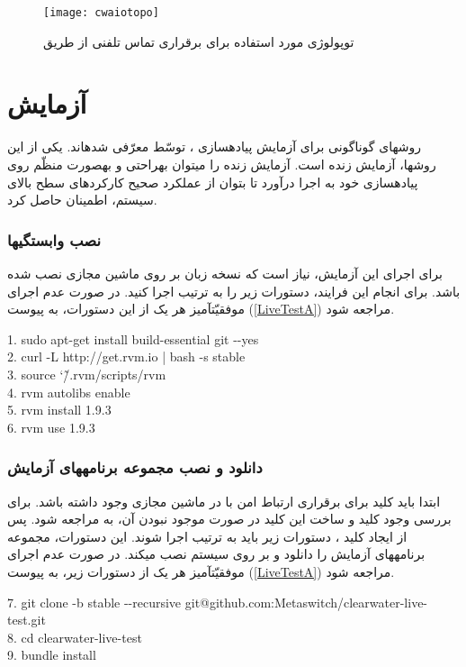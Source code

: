 \begin{figure}[H]
\centering
\texttt{[image: cwaiotopo]}
\caption{توپولوژی مورد استفاده برای برقراری تماس تلفنی از طریق }
\label{cwtopo}
\end{figure}

\section{آزمایش }
\label{livetestPart}

روش\nf های گوناگونی برای آزمایش پیاده\nf سازی ، توسّط  معرّفی شده\nf اند. یکی از این روش\nf ها، آزمایش زنده است. آزمایش زنده را می\nf توان به\nf راحتی و به\nf صورت منظّم روی پیاده\nf سازی خود به اجرا درآورد تا بتوان از عملکرد صحیح کارکردهای سطح بالای سیستم، اطمینان حاصل کرد.

\subsubsection{نصب وابستگی\nf ها}
برای اجرای این آزمایش، نیاز است که نسخه  زبان  بر روی ماشین مجازی  نصب شده باشد. برای انجام این فرایند، دستورات زیر را به ترتیب اجرا کنید.  در صورت عدم اجرای موفقیّت\nf آمیز هر یک از این دستورات، به پیوست (\ref{LiveTestA}) مراجعه شود.

\begin{latin}
\setlength{\parindent}{0ex}
1. sudo apt-get install build-essential git  -\nf -yes\\
2. curl -L http://get.rvm.io | bash -s stable\\
3. source \char`\~/.rvm/scripts/rvm\\
4. rvm autolibs enable\\
5. rvm install 1.9.3\\
6. rvm use 1.9.3\\
\end{latin}

\subsubsection{دانلود و نصب مجموعه برنامه\nf های  آزمایش  }

 ابتدا باید کلید  برای برقراری ارتباط امن با  در ماشین مجازی  وجود داشته باشد. برای بررسی وجود کلید  و ساخت این کلید در صورت موجود نبودن آن، به \cite{gitssh} مراجعه شود. پس از ایجاد کلید ، دستورات زیر باید به ترتیب اجرا شوند. این دستورات، مجموعه برنامه\nf های آزمایش  را دانلود و بر روی سیستم نصب می\nf کند. در صورت عدم اجرای موفقیّت\nf آمیز هر یک از دستورات زیر، به پیوست (\ref{LiveTestA}) مراجعه شود.
\begin{latin}
\setlength{\parindent}{0ex}
7. git clone -b stable -\nf -recursive git@github.com:Metaswitch/clearwater-live-test.git\\
8. cd clearwater-live-test\\
9. bundle install
\end{latin}

